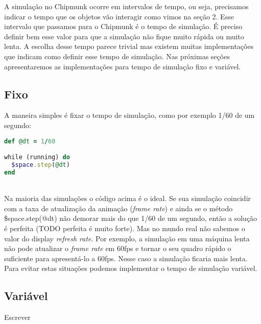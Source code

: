 A simulação no Chipmunk ocorre em intervalos de tempo, ou seja, precisamos indicar o tempo que os objetos vão interagir como vimos na seção 2.  Esse intervalo que passamos para o Chipmunk é o tempo de simulação. É preciso definir bem esse valor para que a simulação não fique muito rápida ou muito lenta. A escolha desse tempo parece trivial mas existem muitas implementações que indicam como definir esse tempo de simulação. Nas  próximas seções apresentaremos as implementações para tempo de simulação fixo e variável.

\subsection{Fixo}

A maneira simples é fixar o tempo de simulação, como por exemplo 1/60 de um segundo:

\begin{lstlisting}[language=Ruby, caption=Implementação de tempo de simulação fixo]
def @dt = 1/60

while (running) do
  $space.step(@dt)
end
\end{lstlisting}

\ \\
Na maioria das simulações o código acima é o ideal. Se sua simulação coincidir com a taxa de atualização da animação (\textit{frame rate}) e ainda se o método \$space.step(@dt) não demorar mais do que 1/60 de um segundo, então a solução é perfeita (TODO perfeita é muito forte). Mas no mundo real não sabemos o valor do display \textit{refresh rate}. Por exemplo, a simulação em uma máquina lenta não pode atualizar o \textit{frame rate} em 60fps e tornar o seu quadro rápido o suficiente para apresentá-lo a 60fps. Nesse caso a simulação ficaria mais lenta. Para evitar estas situações podemos implementar o tempo de simulação variável.

\subsection{Variável}

Escrever
